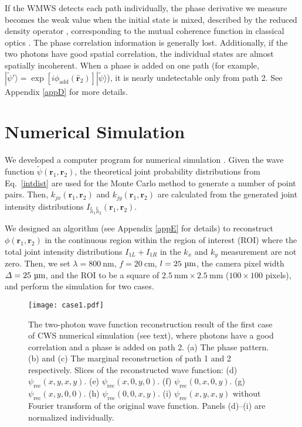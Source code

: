 \documentclass[pra,english,reprint,nofootinbib,aps,superscriptaddress,showpacs,showkeys]{revtex4-2}
\theoremstyle{definition}
\theoremstyle{remark}
\begin{document}
	If the WMWS detects each path individually, the phase derivative we measure becomes the weak value when the initial state is mixed, described by the reduced density operator \cite{wvmix}, corresponding to the mutual coherence function in classical optics \cite{Zheng2021,Zhou2021,qrmcf}. The phase correlation information is generally lost. Additionally, if the two photons have good spatial correlation, the individual states are almost spatially incoherent. When a phase is added on one path (for example, $|\tilde{\psi}'\rangle=\exp[i\phi_\textrm{add}(\hat{\mathbf{r}}_2)]|\tilde{\psi}\rangle$), it is nearly undetectable only from path 2. See Appendix \ref{appD} for more details.
	
	\section{Numerical Simulation}\label{sec3}
	
	We developed a computer program for numerical simulation \cite{SourceCode}. Given the wave function $\tilde{\psi}(\mathbf{r}_1,\mathbf{r}_2)$, the theoretical joint probability distributions from Eq.~\eqref{intdist} are used for the Monte Carlo method to generate a number of point pairs. Then, $k_{jx}(\mathbf{r}_1,\mathbf{r}_2)$ and $k_{jy}(\mathbf{r}_1,\mathbf{r}_2)$ are calculated from the generated joint intensity distributions $I_{{^L_R}_1{^L_R}_2}(\mathbf{r}_1,\mathbf{r}_2)$.
	
	We designed an algorithm (see Appendix \ref{appE} for details) to reconstruct $\phi(\mathbf{r}_1,\mathbf{r}_2)$ in the continuous region within the region of interest (ROI) where the total joint intensity distributions $I_{1L}+I_{1R}$ in the $k_x$ and $k_y$ measurement are not zero. Then, we set $\lambda=800~\textrm{nm}$, $f=20~\textrm{cm}$, $l=25~\textrm{\textmu m}$, the camera pixel width $\varDelta=25~\textrm{\textmu m}$, and the ROI to be a square of $2.5~\textrm{mm}\times2.5~\textrm{mm}$ ($100\times100$ pixels), and perform the simulation for two cases.
	
	\begin{figure}[b]
		\centering
		\texttt{[image: case1.pdf]}
		\caption{The two-photon wave function reconstruction result of the first case of CWS numerical simulation (see text), where photons have a good correlation and a phase is added on path 2. (a) The phase pattern. (b) and (c) The marginal reconstruction of path 1 and 2 respectively. Slices of the reconstructed wave function: (d) $\psi_\textrm{rec}(x,y,x,y)$. (e) $\psi_\textrm{rec}(x,0,y,0)$. (f) $\psi_\textrm{rec}(0,x,0,y)$. (g) $\psi_\textrm{rec}(x,y,0,0)$. (h) $\psi_\textrm{rec}(0,0,x,y)$. (i) $\psi_\textrm{rec}(x,y,x,y)$ without Fourier transform of the original wave function. Panels (d)--(i) are normalized individually.
		}
		\label{figcase1}
	\end{figure}
	
\end{document}
